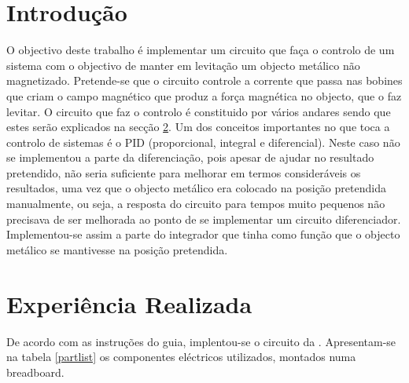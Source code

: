 \documentclass[%
  reprint,
  nofootinbib,
  amsmath,amssymb,
  aps,
  10pt,
  a4paper
]{revtex4-1}
\begin{document}
\section{Introdução}
\label{s:intro}

O objectivo deste trabalho é implementar um circuito que faça o controlo de um sistema com o objectivo de manter em levitação um objecto metálico não magnetizado. Pretende-se que o circuito controle a corrente que passa nas bobines que criam o campo magnético que produz a força magnética no objecto, que o faz levitar. O circuito que faz o controlo é constituido por vários andares sendo que estes serão explicados na secção \ref{s:expreal}. Um dos conceitos importantes no que toca a controlo de sistemas é o PID (proporcional, integral e diferencial). Neste caso não se implementou a parte da diferenciação, pois apesar de ajudar no resultado pretendido, não seria suficiente para melhorar em termos consideráveis os resultados, uma vez que o objecto metálico era colocado na posição pretendida manualmente, ou seja, a resposta do circuito para tempos muito pequenos não precisava de ser melhorada ao ponto de se implementar um circuito diferenciador. Implementou-se assim a parte do integrador que tinha como função que o objecto metálico se mantivesse na posição pretendida.


\section{Experiência Realizada}
\label{s:expreal}
De acordo com as instruções do guia, implentou-se o circuito da . Apresentam-se na tabela \ref{partlist} os componentes eléctricos utilizados, montados numa breadboard.

\end{document}
